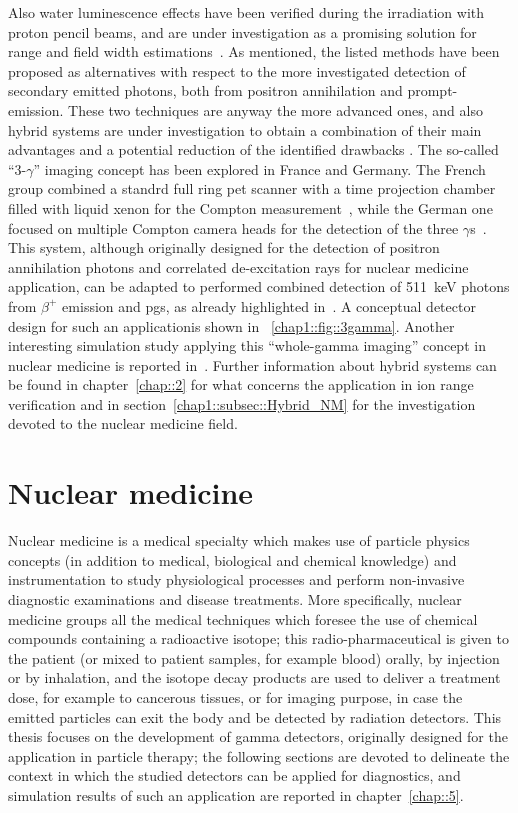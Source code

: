 Also water luminescence effects have been verified during the irradiation  with proton pencil beams, and are under investigation as a promising solution for range and field width estimations~\parencite{Komori2018}.   
As mentioned, the listed methods have been proposed as alternatives with respect to the more investigated detection of secondary emitted photons, both from positron annihilation and prompt-emission. These two techniques are anyway the more advanced ones, and also hybrid systems are under investigation to obtain a combination of their main advantages and a potential reduction of the identified drawbacks .  
The so-called \enquote{3-$\gamma$} imaging concept has been explored in France and Germany. The French group combined a standrd full ring \gls{pet} scanner with a time projection chamber filled with liquid xenon for the Compton measurement~\parencite{Oger2012}, while the German one focused on multiple Compton camera heads for the detection of the three $\gamma$s~\parencite{Lang2014}. This system, although originally designed for the detection of positron annihilation photons and correlated de-excitation rays for nuclear medicine application, can be adapted to performed combined detection of 511~keV photons from $\beta^+$ emission and \glspl{pg}, as already highlighted in~\parencite{Lang2014}. A conceptual detector design for such an applicationis shown in \figurename~\ref{chap1::fig::3gamma}. Another interesting simulation study applying this \enquote{whole-gamma imaging} concept in nuclear medicine is reported in~\parencite{Yamaya2017b}. 
Further information about hybrid systems can be found in chapter~\ref{chap::2} for what concerns the application in ion range verification and in section~\ref{chap1::subsec::Hybrid_NM} for the investigation devoted to the nuclear medicine field.

\newpage

\section{Nuclear medicine}\label{chap1::sec::NuclearMed}

Nuclear medicine is a medical specialty which makes use of particle physics concepts (in addition to medical, biological and chemical knowledge) and instrumentation to study physiological processes and perform non-invasive diagnostic examinations and disease treatments. More specifically, nuclear medicine groups all the medical techniques which foresee the use of chemical compounds containing a radioactive isotope; this radio-pharmaceutical is given to the patient (or mixed to patient samples, for example blood) orally, by injection or by inhalation, and the isotope decay products are used to deliver a treatment dose, for example to cancerous tissues, or for imaging purpose, in case the emitted particles can exit the body and be detected by radiation detectors. 
This thesis focuses on the development of gamma detectors, originally designed for the application in particle therapy; the following sections are devoted to delineate the context in which the studied detectors can be applied for diagnostics, and simulation results of such an application are reported in chapter~\ref{chap::5}.

